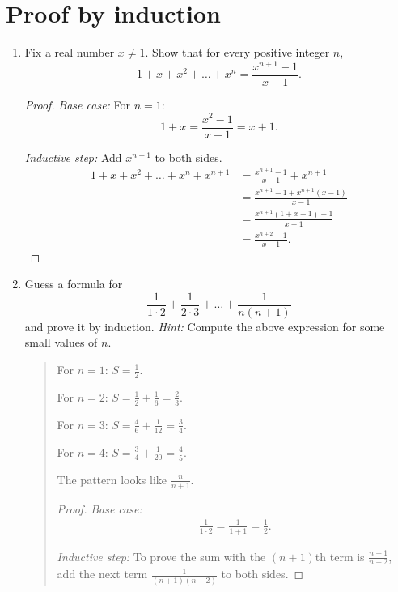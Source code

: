 \documentclass{article}
\newenvironment{answer}{
\begin{quote}}{
\end{quote}}
\begin{document}
\section{Proof by induction}

\begin{enumerate}

  \item Fix a real number $x \neq 1$. Show that for every positive integer $n$,
    \[
      1 + x + x^2 + \ldots + x^n = \frac{x^{n+1} - 1}{x - 1}.
    \]

    \begin{proof}
      \textit{Base case:} For $n=1$:
      \[
        1+x=\frac{x^2-1}{x-1}=x+1.
      \]

      \textit{Inductive step:} Add $x^{n+1}$ to both sides.
      \begin{align*}
        1+x+x^2+\ldots+x^n+x^{n+1}&=\frac{x^{n+1}-1}{x-1}+x^{n+1} \\
        &= \frac{x^{n+1}-1+x^{n+1}(x-1)}{x-1} \\
        &= \frac{x^{n+1}(1+x-1)-1}{x-1} \\
        &= \frac{x^{n+2}-1}{x-1}
        .
      \end{align*}
    \end{proof}

  \item Guess a formula for
    \[
      \frac{1}{1 \cdot 2} + \frac{1}{2 \cdot 3} + \ldots + \frac{1}{n(n+1)}
    \]
    and prove it by induction. \textit{Hint:} Compute the above
    expression for some small values of $n$.

    \begin{answer}
      For $n=1$: $S=\frac{1}{2}$.

      For $n=2$: $S=\frac{1}{2}+\frac{1}{6}=\frac{2}{3}$.

      For $n=3$: $S=\frac{4}{6}+\frac{1}{12}=\frac{3}{4}$.

      For $n=4$: $S=\frac{3}{4}+\frac{1}{20}=\frac{4}{5}$.

      The pattern looks like $\frac{n}{n+1}$.

      \begin{proof}
        \textit{Base case:}
        \begin{align*}
          \frac{1}{1 \cdot 2} = \frac{1}{1+1} = \frac{1}{2}
          .
        \end{align*}

        \textit{Inductive step:} To prove the sum with the $(n+1)$th
        term is $\frac{n+1}{n+2}$, add the next term
        $\frac{1}{(n+1)(n+2)}$ to both sides.


\end{proof}
\end{answer}
\end{enumerate}
\end{document}
